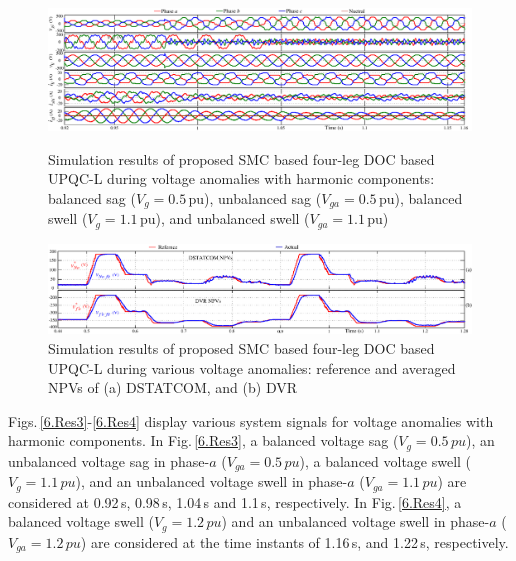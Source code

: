 \begin{figure}\centering
	\includegraphics[scale=0.72	]{figures/Chapter_6/Mine/Res3.pdf}
	\caption{Simulation results of proposed SMC based four-leg DOC based UPQC-L during voltage anomalies with harmonic components: balanced sag ($V_g = 0.5\,$pu), unbalanced sag ($V_{ga} = 0.5\,$pu), balanced swell ($V_g = 1.1\,$pu), and unbalanced swell ($V_{ga} = 1.1\,$pu)} 
	\label{6.Res3} \vspace*{0.5cm}
	\includegraphics[scale=0.72	]{figures/Chapter_6/Mine/Res5.pdf}
	\caption{Simulation results of proposed SMC based four-leg DOC based UPQC-L during various voltage anomalies: reference and averaged NPVs of (a) DSTATCOM, and (b) DVR} 
	\label{6.Res5} 
\end{figure}

Figs.\,\ref{6.Res3}-\ref{6.Res4} display various system signals for voltage anomalies with harmonic components. In Fig.\,\ref{6.Res3}, a balanced voltage sag ($V_{g} = 0.5\, \si{pu}$), an unbalanced voltage sag in phase-$a$ ($V_{ga} = 0.5\, \si{pu}$), a balanced voltage swell ($V_{g} = 1.1\, \si{pu}$), and an unbalanced voltage swell in phase-$a$ ($V_{ga} = 1.1\, \si{pu}$) are considered at 0.92\,s, 0.98\,s, 1.04\,s and 1.1\,s, respectively. In Fig.\,\ref{6.Res4}, a balanced voltage swell ($V_{g} = 1.2\, \si{pu}$) and an unbalanced voltage swell in phase-$a$ ($V_{ga} = 1.2\, \si{pu}$) are considered at the time instants of 1.16\,s, and 1.22\,s, respectively.

